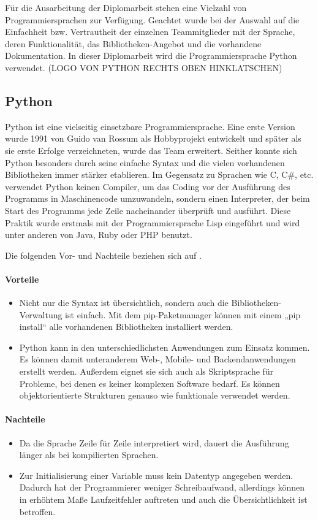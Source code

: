 Für die Ausarbeitung der Diplomarbeit stehen eine Vielzahl von Programmiersprachen zur Verfügung. Geachtet wurde bei der Auswahl auf die Einfachheit bzw. Vertrautheit der einzelnen Teammitglieder mit der Sprache, deren Funktionalität, das Bibliotheken-Angebot und die vorhandene Dokumentation. In dieser Diplomarbeit wird die Programmiersprache Python verwendet.
(LOGO VON PYTHON RECHTS OBEN HINKLATSCHEN) 

\subsection{Python}
Python ist eine vielseitig einsetzbare Programmiersprache. Eine erste Version wurde 1991 von Guido van Rossum als Hobbyprojekt entwickelt und später als sie erste Erfolge verzeichneten, wurde das Team erweitert. Seither konnte sich Python besonders durch seine einfache Syntax und die vielen vorhandenen Bibliotheken immer stärker etablieren. Im Gegensatz zu Sprachen wie C, C\#, etc. verwendet Python keinen Compiler, um das Coding vor der Ausführung des Programms in Maschinencode umzuwandeln, sondern einen Interpreter, der beim Start des Programms jede Zeile nacheinander überprüft und ausführt. Diese Praktik wurde erstmals mit der Programmiersprache Lisp eingeführt und wird unter anderen von Java, Ruby oder PHP benutzt. 
\cite{Python_Software_Foundation:o.J., Pramanick_gfg:2019, Ryte:2021}

Die folgenden Vor- und Nachteile beziehen sich auf \textcite{Ceaseo:2020}.
\paragraph{Vorteile}
\begin{itemize}
	\item Nicht nur die Syntax ist übersichtlich, sondern auch die Bibliotheken-Verwaltung ist einfach. Mit dem pip-Paketmanager können mit einem „pip install“ alle vorhandenen Bibliotheken installiert werden.
	\item Python kann in den unterschiedlichsten Anwendungen zum Einsatz kommen. Es können damit unteranderem Web-, Mobile- und Backendanwendungen erstellt werden. Außerdem eignet sie sich auch als Skriptsprache für Probleme, bei denen es keiner komplexen Software bedarf. Es können objektorientierte Strukturen genauso wie funktionale verwendet werden. 
\end{itemize}

\paragraph{Nachteile}
\begin{itemize}{}{}
	\item Da die Sprache Zeile für Zeile interpretiert wird, dauert die Ausführung länger als bei kompilierten Sprachen.
	\item Zur Initialisierung einer Variable muss kein Datentyp angegeben werden. Dadurch hat der Programmierer weniger Schreibaufwand, allerdings können in erhöhtem Maße Laufzeitfehler auftreten und auch die Übersichtlichkeit ist betroffen.	
\end{itemize}

